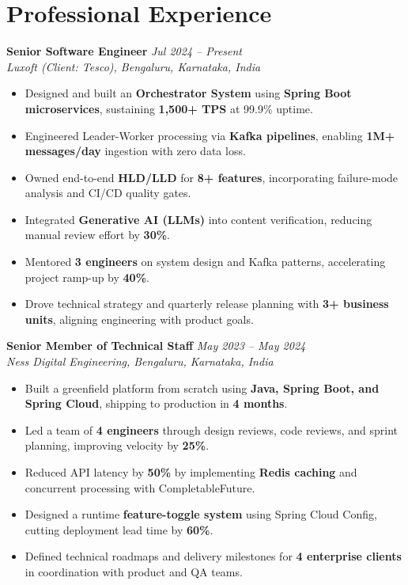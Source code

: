 \documentclass[10pt,a4paper]{article}
\begin{document}
\vspace{1pt}
\section{Professional Experience}
\vspace{0.5pt}

\textbf{Senior Software Engineer} \hfill \textit{Jul 2024 -- Present}\\[-1pt]
\textit{Luxoft (Client: Tesco), Bengaluru, Karnataka, India}
\begin{itemize}[label=\textbullet]
  \item Designed and built an \textbf{Orchestrator System} using \textbf{Spring Boot microservices}, sustaining \textbf{1,500+ TPS} at 99.9\% uptime.
  \item Engineered Leader-Worker processing via \textbf{Kafka pipelines}, enabling \textbf{1M+ messages/day} ingestion with zero data loss.
  \item Owned end-to-end \textbf{HLD/LLD} for \textbf{8+ features}, incorporating failure-mode analysis and CI/CD quality gates.
  \item Integrated \textbf{Generative AI (LLMs)} into content verification, reducing manual review effort by \textbf{30\%}.
  \item Mentored \textbf{3 engineers} on system design and Kafka patterns, accelerating project ramp-up by \textbf{40\%}.
  \item Drove technical strategy and quarterly release planning with \textbf{3+ business units}, aligning engineering with product goals.
\end{itemize}

\vspace{0.5pt}
\textbf{Senior Member of Technical Staff} \hfill \textit{May 2023 -- May 2024}\\[-1pt]
\textit{Ness Digital Engineering, Bengaluru, Karnataka, India}
\begin{itemize}[label=\textbullet]
  \item Built a greenfield platform from scratch using \textbf{Java, Spring Boot, and Spring Cloud}, shipping to production in \textbf{4 months}.
  \item Led a team of \textbf{4 engineers} through design reviews, code reviews, and sprint planning, improving velocity by \textbf{25\%}.
  \item Reduced API latency by \textbf{50\%} by implementing \textbf{Redis caching} and concurrent processing with CompletableFuture.
  \item Designed a runtime \textbf{feature-toggle system} using Spring Cloud Config, cutting deployment lead time by \textbf{60\%}.
  \item Defined technical roadmaps and delivery milestones for \textbf{4 enterprise clients} in coordination with product and QA teams.
\end{itemize}
\end{document}
